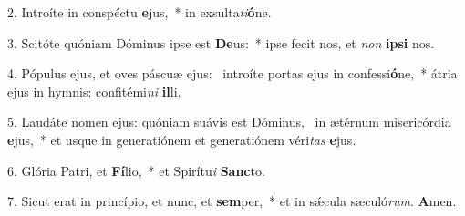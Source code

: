 2. Introíte in conspéctu \textbf{e}jus,~*  in exsulta\textit{ti}\textbf{ó}ne.\

3. Scitóte quóniam Dóminus ipse est \textbf{De}us:~*  ipse fecit nos, et \textit{non} \textbf{ip}\textbf{si} nos.\

4. Pópulus ejus, et oves páscuæ ejus: \dag\  introíte portas ejus in confessi\textbf{ó}ne,~*  átria ejus in hymnis: confitémi\textit{ni} \textbf{il}li.\

5. Laudáte nomen ejus: quóniam suávis est Dóminus, \dag\  in ætérnum misericórdia \textbf{e}jus,~*  et usque in generatiónem et generatiónem véri\textit{tas} \textbf{e}jus.\

6. Glória Patri, et \textbf{Fí}lio,~*  et Spirítu\textit{i} \textbf{Sanc}to.\

7. Sicut erat in princípio, et nunc, et \textbf{sem}per,~*  et in sǽcula sæculó\textit{rum}. \textbf{A}men.\

